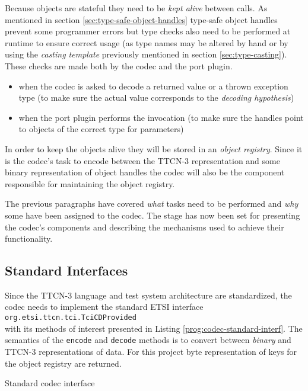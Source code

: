 Because objects are stateful they need to be \emph{kept alive} between calls.
As mentioned in section \ref{sec:type-safe-object-handles}
type-safe object handles prevent some programmer errors
but type checks also need to be performed at runtime to ensure correct usage
(as type names may be altered by hand or by using the \emph{casting template}
previously mentioned in section \ref{sec:type-casting}).
These checks are made both by the codec and the port plugin.
\begin{itemize}
\item when the codec is asked to
decode a returned value or a thrown exception type
(to make sure the actual value corresponds to the \emph{decoding hypothesis})
\item when the port plugin performs the invocation (to make sure
the handles point to objects of the correct type for parameters)
\end{itemize}

In order to keep the objects alive they will be stored
in an \emph{object registry}.
Since it is the codec's task to encode between the \ac{TTCN-3} representation
and some binary representation of object handles
the codec will also be the component responsible for
maintaining the object registry.

The previous paragraphs have covered \emph{what} tasks need to be performed
and \emph{why} some have been assigned to the codec.
The stage has now been set for presenting the codec's components
and describing the mechanisms used to achieve their functionality.


\subsection{Standard Interfaces}

Since the \ac{TTCN-3} language and test system architecture are standardized,
the codec needs to implement the standard \ac{ETSI} interface\\
\verb=org.etsi.ttcn.tci.TciCDProvided=\\
with its methods of interest presented in
Listing \ref{prog:codec-standard-interf}.
The semantics of the \verb=encode= and \verb=decode= methods
is to convert between \emph{binary} and \ac{TTCN-3} representations of data.
For this project byte representation of keys for the object registry
are returned.

\begin{program}
\caption{Standard codec interface\label{prog:codec-standard-interf}}
\end{program}

